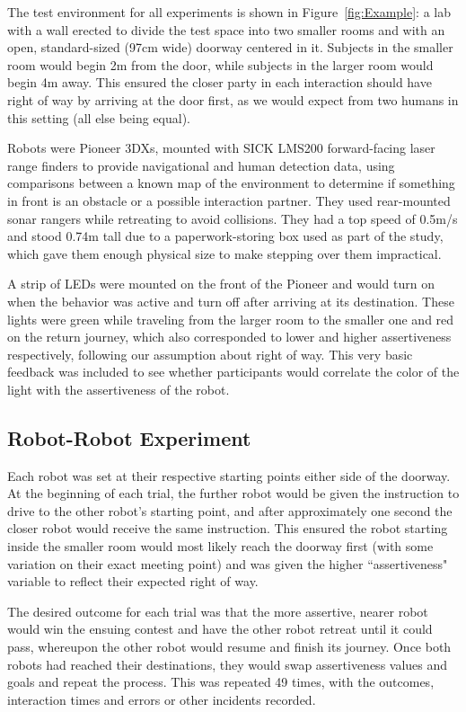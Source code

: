 \documentclass[letterpaper, 10 pt, conference]{ieeeconf}  %
\begin{document}
The test environment for all experiments is shown in Figure~\ref{fig:Example}: a lab with a wall erected to divide the test space into two smaller rooms and with an open, standard-sized (97cm wide) doorway centered in it. Subjects in the smaller room would begin 2m from the door, while subjects in the larger room would begin 4m away. This ensured the closer party in each interaction should have right of way by arriving at the door first, as we would expect from two humans in this setting (all else being equal).

Robots were Pioneer 3DXs, mounted with SICK LMS200 forward-facing laser range finders to provide navigational and human detection data, using comparisons between a known map of the environment to determine if something in front is an obstacle or a possible interaction partner. They used rear-mounted sonar rangers while retreating to avoid collisions. They had a top speed of 0.5m/s and stood 0.74m tall due to a paperwork-storing box used as part of the study, which gave them enough physical size to make stepping over them impractical. %

A strip of LEDs were mounted on the front of the Pioneer and would turn on when the behavior was active and turn off after arriving at its destination. These lights were green while traveling from the larger room to the smaller one and red on the return journey, which also corresponded to lower and higher assertiveness respectively, following our assumption about right of way. This very basic feedback was included to see whether participants would correlate the color of the light with the assertiveness of the robot.

\subsection{Robot-Robot Experiment}

Each robot was set at their respective starting points either side of the doorway. At the beginning of each trial, the further robot would be given the instruction to drive to the other robot’s starting point, and after approximately one second the closer robot would receive the same instruction. This ensured the robot starting inside the smaller room would most likely reach the doorway first (with some variation on their exact meeting point) and was given the higher ``assertiveness" variable to reflect their expected right of way.

The desired outcome for each trial was that the more assertive, nearer robot would win the ensuing contest and have the other robot retreat until it could pass, whereupon the other robot would resume and finish its journey. Once both robots had reached their destinations, they would swap assertiveness values and goals and repeat the process. This was repeated 49 times, with the outcomes, interaction times and errors or other incidents recorded. 
\end{document}
